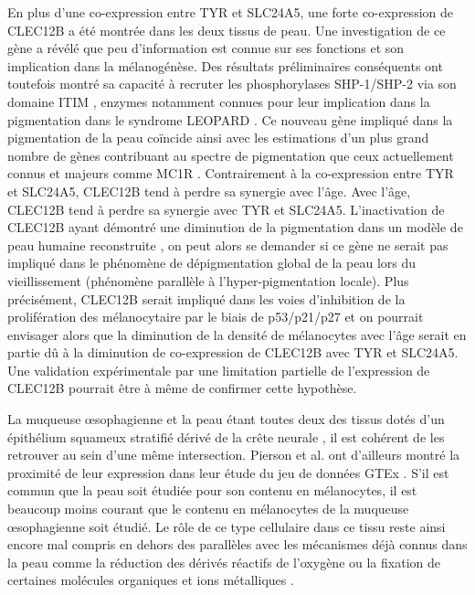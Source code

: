 En plus d'une co-expression entre TYR et SLC24A5, une forte co-expression de CLEC12B a été montrée dans les deux tissus de peau. Une investigation de ce gène a révélé que peu d'information est connue sur ses fonctions et son implication dans la mélanogénèse. Des résultats préliminaires conséquents ont toutefois montré sa capacité à recruter les phosphorylases SHP-1/SHP-2 via son domaine ITIM , enzymes notamment connues pour leur implication dans la pigmentation dans le syndrome LEOPARD . Ce nouveau gène impliqué dans la pigmentation de la peau coïncide ainsi avec les estimations d'un plus grand nombre de gènes contribuant au spectre de pigmentation que ceux actuellement connus et majeurs comme MC1R . 
Contrairement à la co-expression entre TYR et SLC24A5, CLEC12B tend à perdre sa synergie avec l'âge. Avec l'âge, CLEC12B tend à perdre sa synergie avec TYR et SLC24A5. L'inactivation de CLEC12B ayant démontré une diminution de la pigmentation dans un modèle de peau humaine reconstruite , on peut alors se demander si ce gène ne serait pas impliqué dans le phénomène de dépigmentation global de la peau lors du vieillissement (phénomène parallèle à l'hyper-pigmentation locale). Plus précisément, CLEC12B serait impliqué dans les voies d'inhibition de la prolifération des mélanocytaire par le biais de p53/p21/p27  et on pourrait envisager alors que la diminution de la densité de mélanocytes avec l'âge serait en partie dû à la diminution de co-expression de CLEC12B avec TYR et SLC24A5. Une validation expérimentale par une limitation partielle de l'expression de CLEC12B pourrait être à même de confirmer cette hypothèse.

La muqueuse œsophagienne et la peau étant toutes deux des tissus dotés d'un épithélium squameux stratifié dérivé de la crête neurale , il est cohérent de les retrouver au sein d'une même intersection. Pierson et al. ont d'ailleurs montré la proximité de leur expression dans leur étude du jeu de données GTEx . S'il est commun que la peau soit étudiée pour son contenu en mélanocytes, il est beaucoup moins courant que le contenu en mélanocytes de la muqueuse œsophagienne soit étudié. Le rôle de ce type cellulaire dans ce tissu reste ainsi encore mal compris en dehors des parallèles avec les mécanismes déjà connus dans la peau comme la réduction des dérivés réactifs de l'oxygène ou la fixation de certaines molécules organiques et ions métalliques . 

